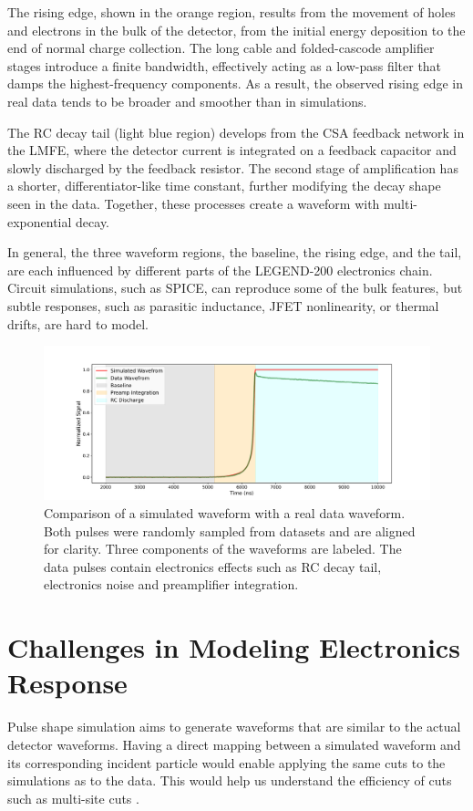 The rising edge, shown in the orange region, results from the movement of holes and electrons in the bulk of the detector, from the initial energy deposition to the end of normal charge collection. The long cable and folded-cascode amplifier stages introduce a finite bandwidth, effectively acting as a low-pass filter that damps the highest-frequency components. As a result, the observed rising edge in real data tends to be broader and smoother than in simulations. 

The RC decay tail (light blue region) develops from the CSA feedback network in the LMFE, where the detector current is integrated on a feedback capacitor and slowly discharged by the feedback resistor. The second stage of amplification has a shorter, differentiator-like time constant, further modifying the decay shape seen in the data. Together, these processes create a waveform with multi-exponential decay. 

In general, the three waveform regions, the baseline, the rising edge, and the tail, are each influenced by different parts of the LEGEND-200 electronics chain. Circuit simulations, such as SPICE, can reproduce some of the bulk features, but subtle responses, such as parasitic inductance, JFET nonlinearity, or thermal drifts, are hard to model.

\begin{figure}[!htb]%
    \includegraphics[width=\linewidth,trim={2.5cm 0pc 3.5cm 0pc},clip]{ch6/figs/wf_comp_sim_data.pdf}
    \caption{Comparison of a simulated waveform with a real data waveform. Both pulses were randomly sampled from datasets and are aligned for clarity. Three components of the waveforms are labeled. The data pulses contain electronics effects such as RC decay tail, electronics noise and preamplifier integration.}
    \label{fig:sim_data_comp}
\end{figure}

\section{Challenges in Modeling Electronics Response}
Pulse shape simulation aims to generate waveforms that are similar to the actual detector waveforms. Having a direct mapping between a simulated waveform and its corresponding incident particle would enable applying the same cuts to the simulations as to the data. This would help us understand the efficiency of cuts such as multi-site cuts \cite{AvsE}.  

